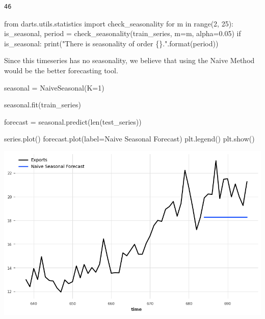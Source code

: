 \documentclass[
  11pt,
]{article}
\newenvironment{Shaded}{\begin{snugshade}}{\end{snugshade}}
\newcommand{\BuiltInTok}[1]{\textcolor[rgb]{0.00,0.23,0.31}{#1}}
\newcommand{\ControlFlowTok}[1]{\textcolor[rgb]{0.00,0.23,0.31}{#1}}
\newcommand{\DecValTok}[1]{\textcolor[rgb]{0.68,0.00,0.00}{#1}}
\newcommand{\FloatTok}[1]{\textcolor[rgb]{0.68,0.00,0.00}{#1}}
\newcommand{\ImportTok}[1]{\textcolor[rgb]{0.00,0.46,0.62}{#1}}
\newcommand{\KeywordTok}[1]{\textcolor[rgb]{0.00,0.23,0.31}{#1}}
\newcommand{\NormalTok}[1]{\textcolor[rgb]{0.00,0.23,0.31}{#1}}
\newcommand{\OperatorTok}[1]{\textcolor[rgb]{0.37,0.37,0.37}{#1}}
\newcommand{\SpecialCharTok}[1]{\textcolor[rgb]{0.37,0.37,0.37}{#1}}
\newcommand{\StringTok}[1]{\textcolor[rgb]{0.13,0.47,0.30}{#1}}
\begin{document}
\begin{verbatim}
46
\end{verbatim}

\begin{Shaded}
\begin{Highlighting}[]
\ImportTok{from}\NormalTok{ darts.utils.statistics }\ImportTok{import}\NormalTok{ check\_seasonality}
\ControlFlowTok{for}\NormalTok{ m }\KeywordTok{in} \BuiltInTok{range}\NormalTok{(}\DecValTok{2}\NormalTok{, }\DecValTok{25}\NormalTok{):}
\NormalTok{    is\_seasonal, period }\OperatorTok{=}\NormalTok{ check\_seasonality(train\_series, m}\OperatorTok{=}\NormalTok{m, alpha}\OperatorTok{=}\FloatTok{0.05}\NormalTok{)}
    \ControlFlowTok{if}\NormalTok{ is\_seasonal:}
        \BuiltInTok{print}\NormalTok{(}\StringTok{"There is seasonality of order }\SpecialCharTok{\{\}}\StringTok{."}\NormalTok{.}\BuiltInTok{format}\NormalTok{(period))}
\end{Highlighting}
\end{Shaded}

Since this timeseries has no seasonality, we believe that using the
Naive Method would be the better forecasting tool.

\begin{Shaded}
\begin{Highlighting}[]

\NormalTok{seasonal }\OperatorTok{=}\NormalTok{ NaiveSeasonal(K}\OperatorTok{=}\DecValTok{1}\NormalTok{) }

\NormalTok{seasonal.fit(train\_series)}

\NormalTok{forecast }\OperatorTok{=}\NormalTok{ seasonal.predict(}\BuiltInTok{len}\NormalTok{(test\_series))}

\NormalTok{series.plot()}
\NormalTok{forecast.plot(label}\OperatorTok{=}\StringTok{\textquotesingle{}Naive Seasonal Forecast\textquotesingle{}}\NormalTok{)}
\NormalTok{plt.legend()}
\NormalTok{plt.show()}
\end{Highlighting}
\end{Shaded}

\includegraphics{hw3_files/figure-pdf/cell-45-output-1.png}
\end{document}
